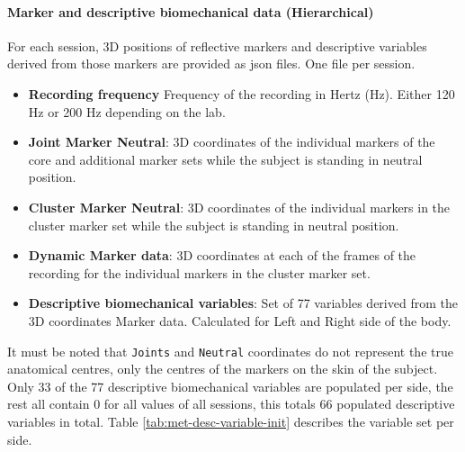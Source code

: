 \paragraph{Marker and descriptive biomechanical data (Hierarchical)} For each session, 3D positions of reflective markers and descriptive variables derived from those markers are provided as json files. One file per session.
\begin{itemize}
    \item \textbf{Recording frequency} Frequency of the recording in Hertz (Hz). Either 120 Hz or 200 Hz depending on the lab.
    \item \textbf{Joint Marker Neutral}: 3D coordinates of the individual markers of the core and additional marker sets while the subject is standing in neutral position.
    \item \textbf{Cluster Marker Neutral}: 3D coordinates of the individual markers in the cluster marker set while the subject is standing in neutral position.
    \item \textbf{Dynamic Marker data}: 3D coordinates at each of the frames of the recording for the individual markers in the cluster marker set.
    \item \textbf{Descriptive biomechanical variables}: Set of 77 variables derived from the 3D coordinates Marker data. Calculated for Left and Right side of the body.
\end{itemize}

It must be noted that \texttt{Joints} and \texttt{Neutral} coordinates do not represent the true anatomical centres, only the centres of the markers on the skin of the subject.
Only 33 of the 77 descriptive biomechanical variables are populated per side, the rest all contain 0 for all values of all sessions, this totals 66 populated descriptive variables in total. Table \ref{tab:met-desc-variable-init} describes the variable set per side.

